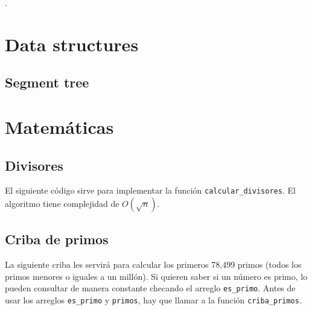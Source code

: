 



\def\title{Tecnológico de Monterrey Campus Querétaro}
.\\[0.2cm]
\tableofcontents\newpage

\section{Data structures}
\subsection{Segment tree}

\section{Matemáticas}
\subsection{Divisores}
El siguiente código sirve para implementar la función \lstinline{calcular_divisores}. El algoritmo tiene complejidad de $O(\sqrt n)$.
\subsection{Criba de primos}
La siguiente criba les servirá para calcular los primeros 78,499 primos (todos los primos menores o iguales a un millón). Si quieren saber si un número es primo, lo pueden consultar de manera constante checando el arreglo \lstinline{es_primo}. Antes de usar los arreglos \lstinline{es_primo} y \lstinline{primos}, hay que llamar a la función \lstinline{criba_primos}.


